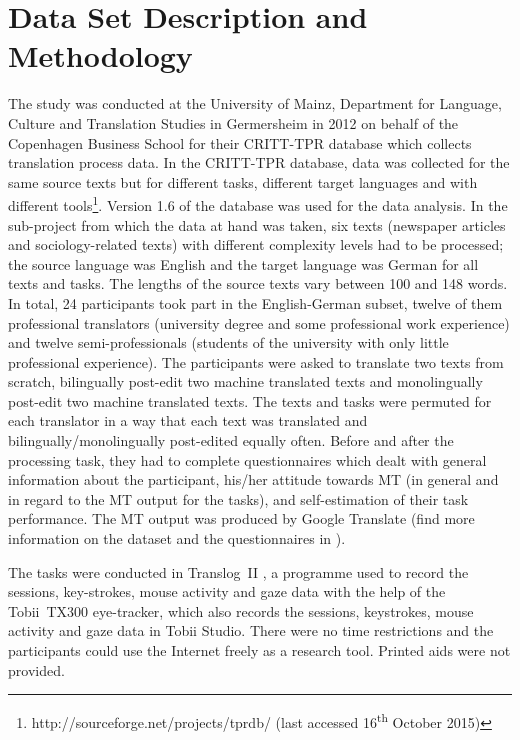 \documentclass[output=paper]{langsci/langscibook}
\begin{document}
\section{Data Set Description and Methodology\label{nitzke:sec:DataSetDescriptionAndMethodology}}

The study was conducted at the University of Mainz, Department for Language, Culture and Translation Studies in Germersheim in 2012 on behalf of the Copenhagen Business School for their CRITT-TPR database \citep{carl2012critt, carl2013} which collects translation process data. In the CRITT-TPR database, data was collected for the same source texts but for different tasks, different target languages and with different tools\footnote{http://sourceforge.net/projects/tprdb/ (last accessed 16\textsuperscript{th} October 2015)}. Version 1.6 of the database was used for the data analysis. In the sub-project from which the data at hand was taken, six texts (newspaper articles and sociology-related texts) with different complexity levels had to be processed; the source language was English and the target language was German for all texts and tasks. The lengths of the source texts vary between 100 and 148 words. In total, 24 participants took part in the English-German subset, twelve of them professional translators (university degree and some professional work experience) and twelve semi-professionals (students of the university with only little professional experience). The participants were asked to translate two texts from scratch, bilingually post-edit two machine translated texts and monolingually post-edit two machine translated texts. The texts and tasks were permuted for each translator in a way that each text was translated and bilingually/monolingually post-edited equally often. Before and after the processing task, they had to complete questionnaires which dealt with general information about the participant, his/her attitude towards MT (in general and in regard to the MT output for the tasks), and self-estimation of their task performance. The MT output was produced by Google Translate (find more information on the dataset and the questionnaires in \citealt{carl2014}).


The tasks were conducted in Translog~II \citep{jakobsen2011, carl2012translog}, a programme used to record the sessions, key-strokes, mouse activity and gaze data with the help of the Tobii~TX300 eye-tracker, which also records the sessions, keystrokes, mouse activity and gaze data in Tobii Studio. There were no time restrictions and the participants could use the Internet freely as a research tool. Printed aids were not provided.
\end{document}
